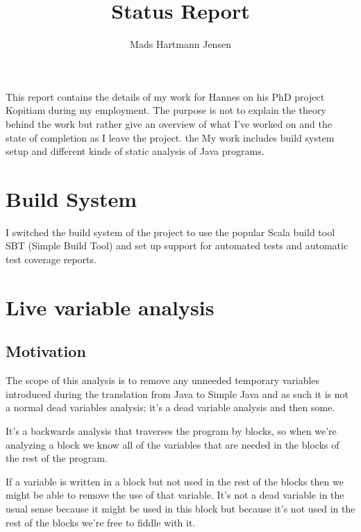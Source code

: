 \documentclass[11pt]{exam}
\title{Status Report}
\author{Mads Hartmann Jensen}
\begin{document}
\maketitle{}

\paragraph{} This report contains the details of my work for Hannes on his PhD project Kopitiam during my employment. The purpose is not to explain the theory behind the work but rather give an overview of what I've worked on and the state of completion as I leave the project. the My work includes build system setup and different kinds of static analysis of Java programs. \newline \newline

\newpage

\tableofcontents

\newpage

\section{Build System}

I switched the build system of the project to use the popular Scala
build tool SBT (Simple Build Tool) and set up support for automated
tests and automatic test coverage reports.

\newpage

\section{Live variable analysis}

\subsection{Motivation}

The scope of this analysis is to remove any unneeded temporary
variables introduced during the translation from Java to Simple Java
and as such it is not a normal dead variables analysis; it's a dead
variable analysis and then some. \newline

It's a backwards analysis that traverses the program by blocks, so
when we're analyzing a block we know all of the variables that are
needed in the blocks of the rest of the program. \newline

If a variable is written in a block but not used in the rest of the
blocks then we might be able to remove the use of that variable. It's
not a dead variable in the usual sense because it might be used in 
this block but because it's not used in the rest of the blocks we're
free to fiddle with it. \newline
\end{document}
